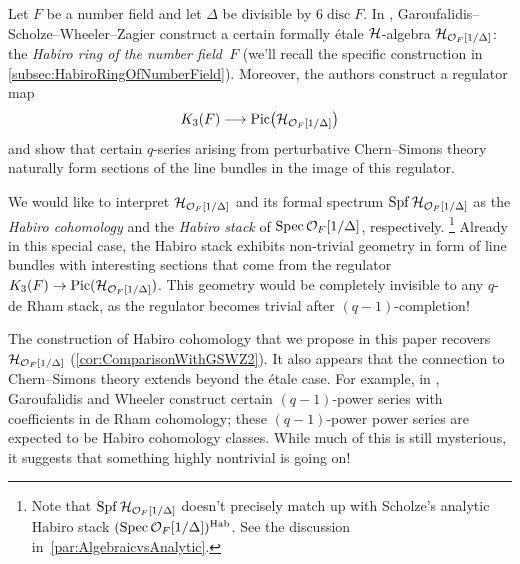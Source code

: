 \documentclass[DIV=12,numbers=enddot,leqno,bibliography=totoc]{scrartcl}
\begin{document}
	\begin{numpar}
		Let $F$ be a number field and let $\Delta$ be divisible by $6\operatorname{disc} F$. In \cite{HabiroRingOfNumberField}, Garoufalidis--Scholze--Wheeler--Zagier construct a certain formally étale $\mathcal{H}$-algebra $\mathcal{H}_{\mathcal{O}_F[1/\Delta]}$: the \emph{Habiro ring of the number field~$F$} (we'll recall the specific construction in \cref{subsec:HabiroRingOfNumberField}). Moreover, the authors construct a regulator map
		\begin{equation*}
			K_3(F)\longrightarrow \operatorname{Pic}\bigl(\mathcal{H}_{\mathcal{O}_F[1/\Delta]}\bigr)
		\end{equation*}
		and show that certain $q$-series arising from perturbative Chern--Simons theory naturally form sections of the line bundles in the image of this regulator.
		
		We would like to interpret $\mathcal{H}_{\mathcal{O}_F[1/\Delta]}$ and its formal spectrum $\operatorname{Spf} \mathcal{H}_{\mathcal{O}_F[1/\Delta]}$ as the \emph{Habiro cohomology} and the \emph{Habiro stack} of $\operatorname{Spec} \mathcal{O}_F[1/\Delta]$, respectively.%
		\footnote{Note that $\operatorname{Spf} \mathcal{H}_{\mathcal{O}_F[1/\Delta]}$ doesn't precisely match up with Scholze's analytic Habiro stack $(\operatorname{Spec} \mathcal{O}_F[1/\Delta])^\mathrm{Hab}$. See the discussion in~\cref{par:AlgebraicvsAnalytic}.}
		Already in this special case, the Habiro stack exhibits non-trivial geometry in form of line bundles with interesting sections that come from the regulator $K_3(F)\rightarrow \operatorname{Pic}(\mathcal{H}_{\mathcal{O}_F[1/\Delta]})$. This geometry would be completely invisible to any $q$-de Rham stack, as the regulator becomes trivial after $(q-1)$-completion!
		
		The construction of Habiro cohomology that we propose in this paper recovers $\mathcal{H}_{\mathcal{O}_F[1/\Delta]}$ (\cref{cor:ComparisonWithGSWZ2}). It also appears that the connection to Chern--Simons theory extends beyond the étale case. For example, in \cite{ExplicitClassesInHabiro}, Garoufalidis and Wheeler construct certain $(q-1)$-power series with coefficients in de Rham cohomology; these $(q-1)$-power power series are expected to be Habiro cohomology classes. While much of this is still mysterious, it suggests that something highly nontrivial is going on! 
	\end{numpar}
	
\end{document}
